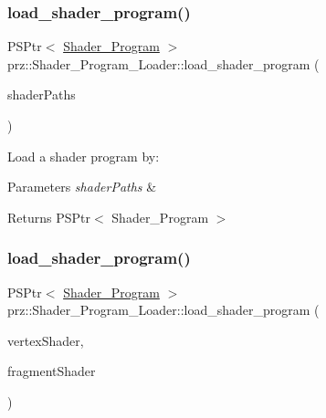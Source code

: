 \subsubsection{\texorpdfstring{load\_shader\_program()}{load\_shader\_program()}\hspace{0.1cm}{\footnotesize\ttfamily [2/4]}}
{\footnotesize\ttfamily P\+S\+Ptr$<$ \mbox{\hyperlink{classprz_1_1_shader___program}{Shader\+\_\+\+Program}} $>$ prz\+::\+Shader\+\_\+\+Program\+\_\+\+Loader\+::load\+\_\+shader\+\_\+program (\begin{DoxyParamCaption}\item[{P\+Buffer$<$ P\+String $>$ \&}]{shader\+Paths }\end{DoxyParamCaption})\hspace{0.3cm}{\ttfamily [inline]}}



Load a shader program by\+: 


\begin{DoxyParams}{Parameters}
{\em shader\+Paths} & \\
\hline
\end{DoxyParams}
\begin{DoxyReturn}{Returns}
P\+S\+Ptr$<$ Shader\+\_\+\+Program $>$ 
\end{DoxyReturn}
\mbox{\label{classprz_1_1_shader___program___loader_a2e7b3a77a496ac0d906852a2c727364e}} 
\subsubsection{\texorpdfstring{load\_shader\_program()}{load\_shader\_program()}\hspace{0.1cm}{\footnotesize\ttfamily [3/4]}}
{\footnotesize\ttfamily P\+S\+Ptr$<$ \mbox{\hyperlink{classprz_1_1_shader___program}{Shader\+\_\+\+Program}} $>$ prz\+::\+Shader\+\_\+\+Program\+\_\+\+Loader\+::load\+\_\+shader\+\_\+program (\begin{DoxyParamCaption}\item[{P\+S\+Ptr$<$ \mbox{\hyperlink{classprz_1_1_vertex___shader}{Vertex\+\_\+\+Shader}} $>$}]{vertex\+Shader,  }\item[{P\+S\+Ptr$<$ \mbox{\hyperlink{classprz_1_1_fragment___shader}{Fragment\+\_\+\+Shader}} $>$}]{fragment\+Shader }\end{DoxyParamCaption})\hspace{0.3cm}{\ttfamily [inline]}}



